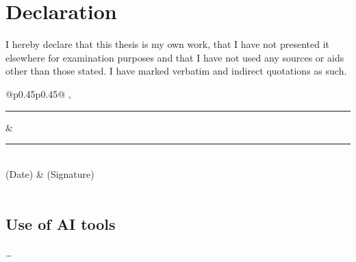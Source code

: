 \clearpage
\thispagestyle{empty}

\section*{Declaration}

I hereby declare that this thesis is my own work, that I have not presented it elsewhere for examination purposes and that I have not used any sources or aids other than those stated. I have marked verbatim and indirect quotations as such.

\vspace{2.0cm}

\noindent
\begin{tabular}{@{}p{}p{}@{}}
	\place, \rule{0.3\textwidth}{0.4pt} & \rule{0.45\textwidth}{0.4pt} \\
	(Date) & (Signature) \\[1.5em]
	 \\
\end{tabular}

\subsection*{Use of AI tools}
\ldots
